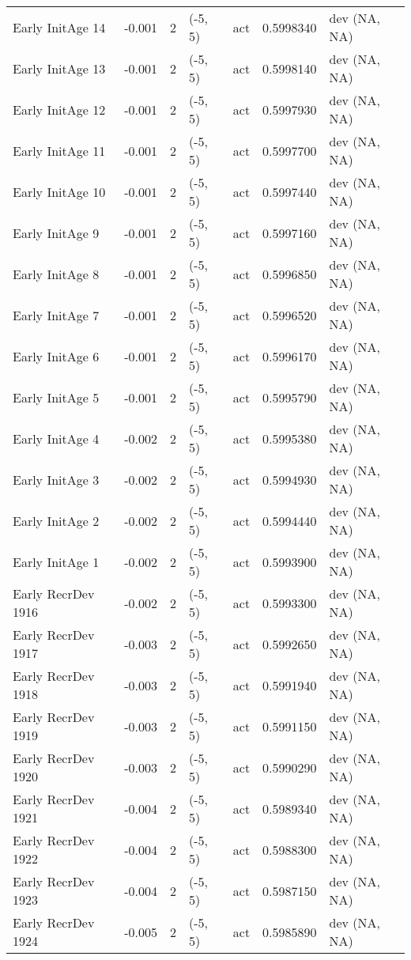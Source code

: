 \documentclass[11pt,
  english,
  letterpaper,
]{article}
\begin{document}
\begin{landscape}
\begin{longtable}[t]{>{\raggedright\arraybackslash}p{7cm}lllll>{\raggedright\arraybackslash}p{4cm}}
Early InitAge 14 & -0.001 & 2 & (-5, 5) & act & 0.5998340 & dev (NA, NA)\\
Early InitAge 13 & -0.001 & 2 & (-5, 5) & act & 0.5998140 & dev (NA, NA)\\
Early InitAge 12 & -0.001 & 2 & (-5, 5) & act & 0.5997930 & dev (NA, NA)\\
Early InitAge 11 & -0.001 & 2 & (-5, 5) & act & 0.5997700 & dev (NA, NA)\\
Early InitAge 10 & -0.001 & 2 & (-5, 5) & act & 0.5997440 & dev (NA, NA)\\
Early InitAge 9 & -0.001 & 2 & (-5, 5) & act & 0.5997160 & dev (NA, NA)\\
Early InitAge 8 & -0.001 & 2 & (-5, 5) & act & 0.5996850 & dev (NA, NA)\\
Early InitAge 7 & -0.001 & 2 & (-5, 5) & act & 0.5996520 & dev (NA, NA)\\
Early InitAge 6 & -0.001 & 2 & (-5, 5) & act & 0.5996170 & dev (NA, NA)\\
Early InitAge 5 & -0.001 & 2 & (-5, 5) & act & 0.5995790 & dev (NA, NA)\\
Early InitAge 4 & -0.002 & 2 & (-5, 5) & act & 0.5995380 & dev (NA, NA)\\
Early InitAge 3 & -0.002 & 2 & (-5, 5) & act & 0.5994930 & dev (NA, NA)\\
Early InitAge 2 & -0.002 & 2 & (-5, 5) & act & 0.5994440 & dev (NA, NA)\\
Early InitAge 1 & -0.002 & 2 & (-5, 5) & act & 0.5993900 & dev (NA, NA)\\
Early RecrDev 1916 & -0.002 & 2 & (-5, 5) & act & 0.5993300 & dev (NA, NA)\\
Early RecrDev 1917 & -0.003 & 2 & (-5, 5) & act & 0.5992650 & dev (NA, NA)\\
Early RecrDev 1918 & -0.003 & 2 & (-5, 5) & act & 0.5991940 & dev (NA, NA)\\
Early RecrDev 1919 & -0.003 & 2 & (-5, 5) & act & 0.5991150 & dev (NA, NA)\\
Early RecrDev 1920 & -0.003 & 2 & (-5, 5) & act & 0.5990290 & dev (NA, NA)\\
Early RecrDev 1921 & -0.004 & 2 & (-5, 5) & act & 0.5989340 & dev (NA, NA)\\
Early RecrDev 1922 & -0.004 & 2 & (-5, 5) & act & 0.5988300 & dev (NA, NA)\\
Early RecrDev 1923 & -0.004 & 2 & (-5, 5) & act & 0.5987150 & dev (NA, NA)\\
Early RecrDev 1924 & -0.005 & 2 & (-5, 5) & act & 0.5985890 & dev (NA, NA)\\

\end{longtable}
\end{landscape}
\end{document}
